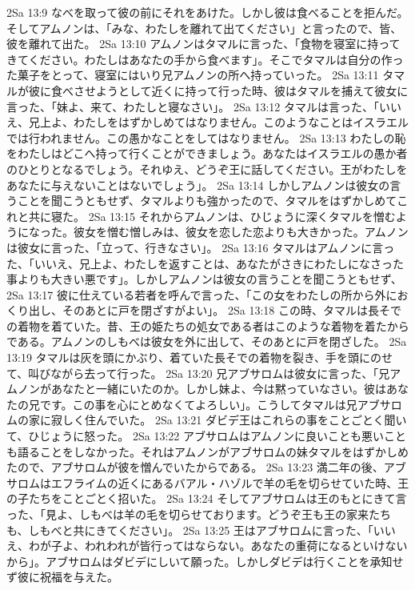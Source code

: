 2Sa 13:9  なべを取って彼の前にそれをあけた。しかし彼は食べることを拒んだ。そしてアムノンは、「みな、わたしを離れて出てください」と言ったので、皆、彼を離れて出た。
2Sa 13:10  アムノンはタマルに言った、「食物を寝室に持ってきてください。わたしはあなたの手から食べます」。そこでタマルは自分の作った菓子をとって、寝室にはいり兄アムノンの所へ持っていった。
2Sa 13:11  タマルが彼に食べさせようとして近くに持って行った時、彼はタマルを捕えて彼女に言った、「妹よ、来て、わたしと寝なさい」。
2Sa 13:12  タマルは言った、「いいえ、兄上よ、わたしをはずかしめてはなりません。このようなことはイスラエルでは行われません。この愚かなことをしてはなりません。
2Sa 13:13  わたしの恥をわたしはどこへ持って行くことができましょう。あなたはイスラエルの愚か者のひとりとなるでしょう。それゆえ、どうぞ王に話してください。王がわたしをあなたに与えないことはないでしょう」。
2Sa 13:14  しかしアムノンは彼女の言うことを聞こうともせず、タマルよりも強かったので、タマルをはずかしめてこれと共に寝た。
2Sa 13:15  それからアムノンは、ひじょうに深くタマルを憎むようになった。彼女を憎む憎しみは、彼女を恋した恋よりも大きかった。アムノンは彼女に言った、「立って、行きなさい」。
2Sa 13:16  タマルはアムノンに言った、「いいえ、兄上よ、わたしを返すことは、あなたがさきにわたしになさった事よりも大きい悪です」。しかしアムノンは彼女の言うことを聞こうともせず、
2Sa 13:17  彼に仕えている若者を呼んで言った、「この女をわたしの所から外におくり出し、そのあとに戸を閉ざすがよい」。
2Sa 13:18  この時、タマルは長そでの着物を着ていた。昔、王の姫たちの処女である者はこのような着物を着たからである。アムノンのしもべは彼女を外に出して、そのあとに戸を閉ざした。
2Sa 13:19  タマルは灰を頭にかぶり、着ていた長そでの着物を裂き、手を頭にのせて、叫びながら去って行った。
2Sa 13:20  兄アブサロムは彼女に言った、「兄アムノンがあなたと一緒にいたのか。しかし妹よ、今は黙っていなさい。彼はあなたの兄です。この事を心にとめなくてよろしい」。こうしてタマルは兄アブサロムの家に寂しく住んでいた。
2Sa 13:21  ダビデ王はこれらの事をことごとく聞いて、ひじょうに怒った。
2Sa 13:22  アブサロムはアムノンに良いことも悪いことも語ることをしなかった。それはアムノンがアブサロムの妹タマルをはずかしめたので、アブサロムが彼を憎んでいたからである。
2Sa 13:23  満二年の後、アブサロムはエフライムの近くにあるバアル・ハゾルで羊の毛を切らせていた時、王の子たちをことごとく招いた。
2Sa 13:24  そしてアブサロムは王のもとにきて言った、「見よ、しもべは羊の毛を切らせております。どうぞ王も王の家来たちも、しもべと共にきてください」。
2Sa 13:25  王はアブサロムに言った、「いいえ、わが子よ、われわれが皆行ってはならない。あなたの重荷になるといけないから」。アブサロムはダビデにしいて願った。しかしダビデは行くことを承知せず彼に祝福を与えた。
